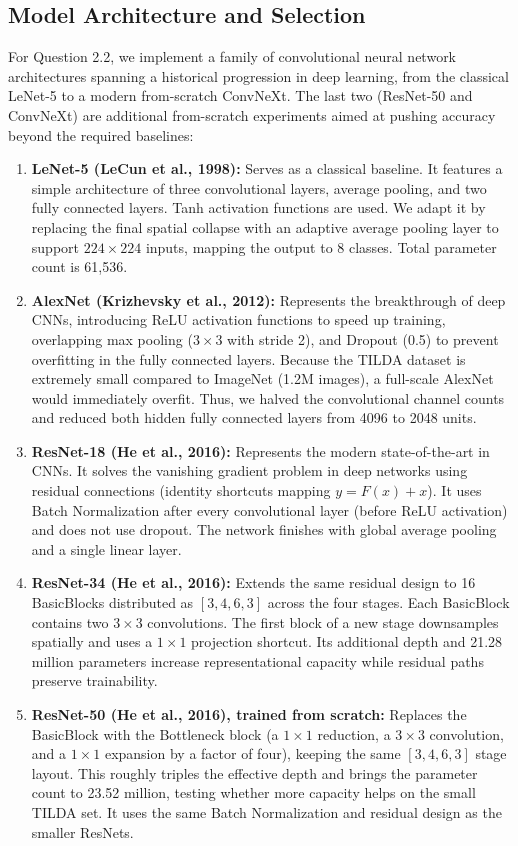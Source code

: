 \documentclass{name}
\begin{document}
\subsection{Model Architecture and Selection}
For Question 2.2, we implement a family of convolutional neural network architectures spanning a historical progression in deep learning, from the classical LeNet-5 to a modern from-scratch ConvNeXt. The last two (ResNet-50 and ConvNeXt) are additional from-scratch experiments aimed at pushing accuracy beyond the required baselines:
\begin{enumerate}
    \item \textbf{LeNet-5 (LeCun et al., 1998):} Serves as a classical baseline. It features a simple architecture of three convolutional layers, average pooling, and two fully connected layers. Tanh activation functions are used. We adapt it by replacing the final spatial collapse with an adaptive average pooling layer to support $224 \times 224$ inputs, mapping the output to 8 classes. Total parameter count is 61,536.
    \item \textbf{AlexNet (Krizhevsky et al., 2012):} Represents the breakthrough of deep CNNs, introducing ReLU activation functions to speed up training, overlapping max pooling ($3 \times 3$ with stride 2), and Dropout (0.5) to prevent overfitting in the fully connected layers. Because the TILDA dataset is extremely small compared to ImageNet (1.2M images), a full-scale AlexNet would immediately overfit. Thus, we halved the convolutional channel counts and reduced both hidden fully connected layers from 4096 to 2048 units.
    \item \textbf{ResNet-18 (He et al., 2016):} Represents the modern state-of-the-art in CNNs. It solves the vanishing gradient problem in deep networks using residual connections (identity shortcuts mapping $y = F(x) + x$). It uses Batch Normalization after every convolutional layer (before ReLU activation) and does not use dropout. The network finishes with global average pooling and a single linear layer.
    \item \textbf{ResNet-34 (He et al., 2016):} Extends the same residual design to 16 BasicBlocks distributed as $[3,4,6,3]$ across the four stages. Each BasicBlock contains two $3 \times 3$ convolutions. The first block of a new stage downsamples spatially and uses a $1 \times 1$ projection shortcut. Its additional depth and 21.28 million parameters increase representational capacity while residual paths preserve trainability.
    \item \textbf{ResNet-50 (He et al., 2016), trained from scratch:} Replaces the BasicBlock with the Bottleneck block (a $1 \times 1$ reduction, a $3 \times 3$ convolution, and a $1 \times 1$ expansion by a factor of four), keeping the same $[3,4,6,3]$ stage layout. This roughly triples the effective depth and brings the parameter count to 23.52 million, testing whether more capacity helps on the small TILDA set. It uses the same Batch Normalization and residual design as the smaller ResNets.

\end{enumerate}
\end{document}
